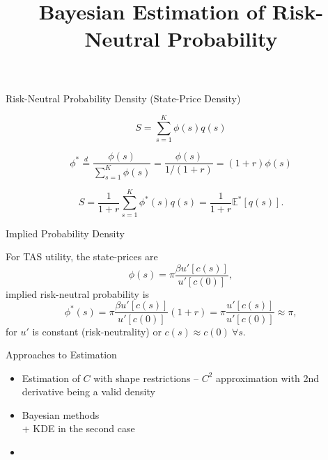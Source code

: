 \documentclass[10pt,aspectratio=43]{beamer}
\title{Bayesian Estimation of Risk-Neutral Probability}
\begin{document}
\begin{frame}[fragile]
    \titlepage
\end{frame}




\begin{frame}{ Risk-Neutral Probability Density (State-Price Density)}

    \[S=\sum_{s=1}^K\phi(s)q(s)\]

    \[\phi^*\overset{d}{=}\frac{\phi(s)}{\sum_{s=1}^K\phi(s)}=\frac{\phi(s)}{1/(1+r)}=(1+r)\phi(s)\]

    \[S=\frac{1}{1+r}\sum_{s=1}^K\phi^*(s)q(s)=\frac{1}{1+r}\mathbb{E}^*[q(s)].\]

\end{frame}
\begin{frame}{Implied  Probability Density}
 
    For TAS utility, the state-prices are 
    \[\phi(s)=\pi\frac{\beta u'[c(s)]}{u'[c(0)]},\]
    \then implied risk-neutral probability is
    \[\phi^*(s)=\pi\frac{\beta u'[c(s)]}{u'[c(0)]}(1+r)= \pi\frac{u'[c(s)]}{u'[c(0)]}\approx \pi,\]
    for $u'$ is constant (risk-neutrality) or $c(s)\approx c(0)~\forall s$.


\end{frame}


\begin{frame}{Approaches to Estimation}
    \begin{itemize}  \setlength\itemsep{1em}
        \item Estimation of $C$ with shape restrictions -- $C^2$ approximation with 2nd derivative being a valid density \\{\scriptsize\parencite{ait-sahaliaNonparametricOptionPricing2003}}
        \item Bayesian methods \\{\scriptsize\parencite{fisherSimplexRegression2016, hardleStatePriceDensities2015,tabogaOptionimpliedProbabilityDistributions2016} + KDE in the second case}
        \item 
    \end{itemize}
\end{frame}
\end{document}
